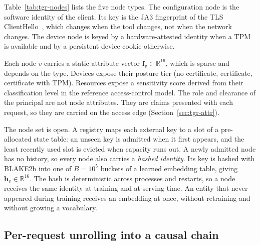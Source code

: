 Table~\ref{tab:tgr-nodes} lists the five node types. The configuration node is the
software identity of the client. Its key is the JA3 fingerprint of the TLS
ClientHello~\cite{ja3}, which changes when the tool changes, not when the network
changes. The device node is keyed by a hardware-attested identity when a TPM is
available and by a persistent device cookie otherwise.

Each node $v$ carries a static attribute vector $\mathbf{f}_v \in \mathbb{R}^{16}$,
which is sparse and depends on the type. Devices expose their posture tier (no
certificate, certificate, certificate with TPM). Resources expose a sensitivity score
derived from their classification level in the reference access-control model. The role
and clearance of the principal are not node attributes. They are claims presented with
each request, so they are carried on the access edge (Section~\ref{sec:tgr-attr}).

The node set is open. A registry maps each external key to a slot of a pre-allocated
state table: an unseen key is admitted when it first appears, and the least recently
used slot is evicted when capacity runs out. A newly admitted node has no history, so
every node also carries a \emph{hashed identity}. Its key is hashed with BLAKE2b into
one of $B = 10^5$ buckets of a learned embedding table, giving
$\mathbf{h}_v \in \mathbb{R}^{16}$. The hash is deterministic across processes and
restarts, so a node receives the same identity at training and at serving time. An
entity that never appeared during training receives an embedding at once, without
retraining and without growing a vocabulary.

\subsection{Per-request unrolling into a causal chain}
\label{sec:tgr-unroll}

